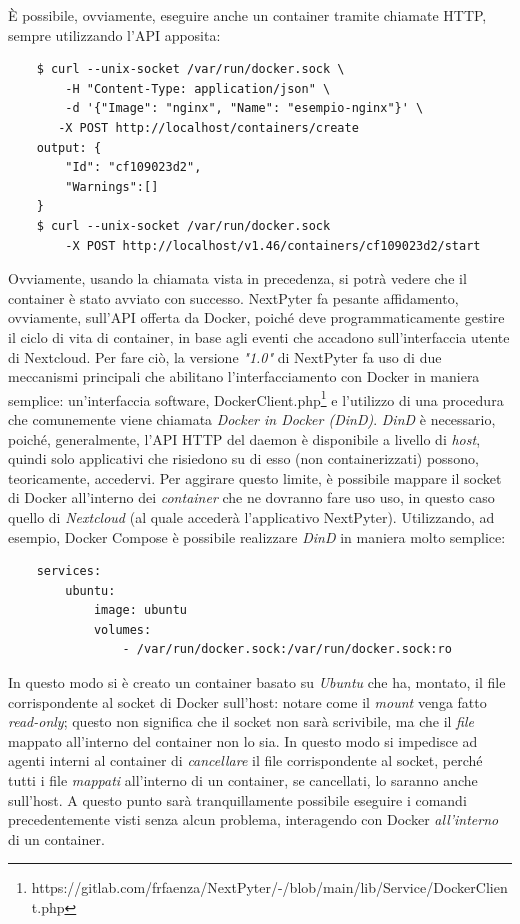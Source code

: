 \newpage
È possibile, ovviamente, eseguire anche un container tramite chiamate HTTP, sempre utilizzando l'API apposita:
\begin{verbatim}
    $ curl --unix-socket /var/run/docker.sock \
        -H "Content-Type: application/json" \
        -d '{"Image": "nginx", "Name": "esempio-nginx"}' \
       -X POST http://localhost/containers/create
    output: {
        "Id": "cf109023d2",
        "Warnings":[]
    }
    $ curl --unix-socket /var/run/docker.sock 
        -X POST http://localhost/v1.46/containers/cf109023d2/start
\end{verbatim}

Ovviamente, usando la chiamata vista in precedenza, si potrà vedere che il container è stato avviato con successo.
\newline
NextPyter fa pesante affidamento, ovviamente, sull'API offerta da Docker, poiché deve programmaticamente gestire il ciclo di vita di container, in base agli eventi che accadono sull'interfaccia utente di Nextcloud. Per fare ciò, la versione \textit{"1.0"} di NextPyter fa uso di due meccanismi principali che abilitano l'interfacciamento con Docker in maniera semplice: un'interfaccia software, DockerClient.php\footnote{https://gitlab.com/frfaenza/NextPyter/-/blob/main/lib/Service/DockerClient.php} e l'utilizzo di una procedura che comunemente viene chiamata \textit{Docker in Docker (DinD)}.
\newline
\textit{DinD} è necessario, poiché, generalmente, l'API HTTP del daemon è disponibile a livello di \textit{host}, quindi solo applicativi che risiedono su di esso (non containerizzati) possono, teoricamente, accedervi. Per aggirare questo limite, è possibile mappare il socket di Docker all'interno dei \textit{container} che ne dovranno fare uso uso, in questo caso quello di \textit{Nextcloud} (al quale accederà l'applicativo NextPyter).
\newline
Utilizzando, ad esempio, Docker Compose è possibile realizzare \textit{DinD} in maniera molto semplice:
\begin{verbatim}
    services:
        ubuntu:
            image: ubuntu
            volumes:
                - /var/run/docker.sock:/var/run/docker.sock:ro
\end{verbatim}
In questo modo si è creato un container basato su \textit{Ubuntu} che ha, montato, il file corrispondente al socket di Docker sull'host: notare come il \textit{mount} venga fatto \textit{read-only}; questo non significa che il socket non sarà scrivibile, ma che il \textit{file} mappato all'interno del container non lo sia. In questo modo si impedisce ad agenti interni al container di \textit{cancellare} il file corrispondente al socket, perché tutti i file \textit{mappati} all'interno di un container, se cancellati, lo saranno anche sull'host.
\newline
A questo punto sarà tranquillamente possibile eseguire i comandi precedentemente visti senza alcun problema, interagendo con Docker \textit{all'interno} di un container.

